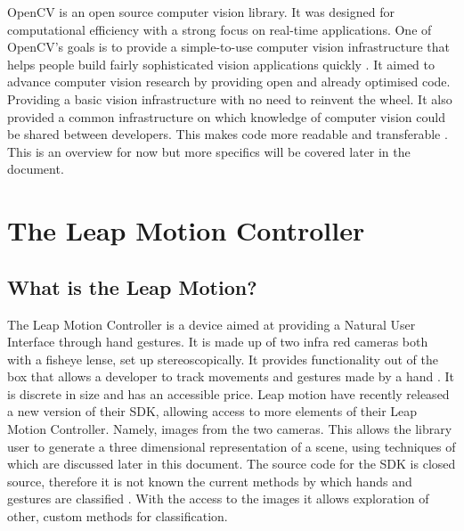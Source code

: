 \documentclass[11pt,oneside]{report}
\begin{document}
				OpenCV is an open source computer vision library.
				It was designed for computational efficiency with a strong focus on real-time applications.
				One of OpenCV's goals is to provide a simple-to-use computer vision infrastructure that helps people build fairly sophisticated vision applications quickly \cite[p. 1]{definition:cv}.	
				It aimed to advance computer vision research by providing open and already optimised code.
				Providing a basic vision infrastructure with no need to reinvent the wheel.
				It also provided a common infrastructure on which knowledge of computer vision could be shared between developers.
				This makes code more readable and transferable \cite[p. 6]{definition:cv}. 
				This is an overview for now but more specifics will be covered later in the document.
				
		\section{The Leap Motion Controller}
			\subsection{What is the Leap Motion?}
				The Leap Motion Controller is a device aimed at providing a Natural User Interface through hand gestures.
				It is made up of two infra red cameras both with a fisheye lense, set up stereoscopically. %
				It provides functionality out of the box that allows a developer to track movements and gestures made by a hand \cite{web:leapGestures}.
				It is discrete in size and has an accessible price. %
				Leap motion have recently released a new version of their SDK, allowing access to more elements of their Leap Motion Controller. 
				Namely, images from the two cameras. 
				This allows the library user to generate a three dimensional representation of a scene, using techniques of which are discussed later in this document. %
				The source code for the SDK is closed source, therefore it is not known the current methods by which hands and gestures are classified \cite[p. 217]{journal:leapEvaluation}.
				With the access to the images it allows exploration of other, custom methods for classification.
\end{document}
